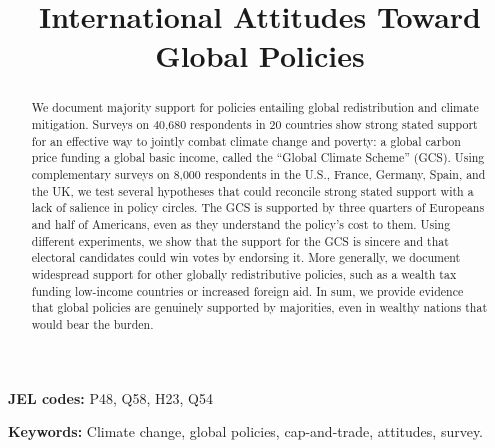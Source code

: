 \title{International Attitudes Toward Global Policies %
} 

\begin{abstract}

  We document majority support for policies entailing global redistribution and climate mitigation. Surveys on 40,680 respondents in 20 countries show strong stated support for an effective way to jointly combat climate change and poverty: a global carbon price funding a global basic income, called the ``Global Climate Scheme'' (GCS). Using complementary surveys on 8,000 respondents in the U.S., France, Germany, Spain, and the UK, we test several hypotheses that could reconcile strong stated support with a lack of salience in policy circles. 
  The GCS is supported by three quarters of Europeans and half of Americans, even as they understand the policy's cost to them. Using different experiments, we show that the support for the GCS is sincere and that electoral candidates could win votes by endorsing it. More generally, we document widespread support for other globally redistributive policies, such as a wealth tax funding low-income countries or increased foreign aid. In sum, we provide evidence that global policies are genuinely supported by majorities, even in wealthy nations that would bear the burden.
\end{abstract}

\textbf{JEL codes:} P48, Q58, H23, Q54 %

\textbf{Keywords:} Climate change, global policies, cap-and-trade, attitudes, survey.%

\tableofcontents

\onehalfspacing %
